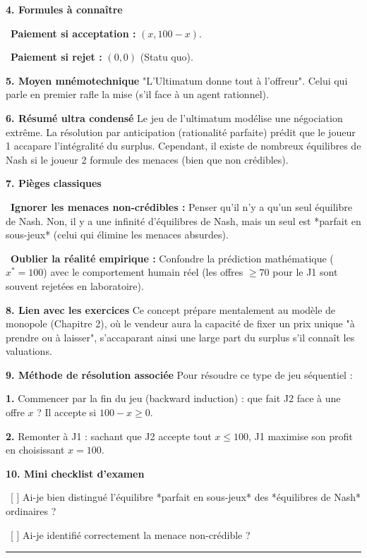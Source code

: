 \documentclass[11pt, a4paper]{report}
\begin{document}
\textbf{4. Formules à connaître}
\par \textbullet\ \textbf{Paiement si acceptation :} $(x, 100-x)$.
\par \textbullet\ \textbf{Paiement si rejet :} $(0, 0)$ (Statu quo).

\textbf{5. Moyen mnémotechnique}
"L'Ultimatum donne tout à l'offreur". Celui qui parle en premier rafle la mise (s'il face à un agent rationnel).

\textbf{6. Résumé ultra condensé}
Le jeu de l'ultimatum modélise une négociation extrême. La résolution par anticipation (rationalité parfaite) prédit que le joueur 1 accapare l'intégralité du surplus. Cependant, il existe de nombreux équilibres de Nash si le joueur 2 formule des menaces (bien que non crédibles).

\textbf{7. Pièges classiques}
\par \textbullet\ \textbf{Ignorer les menaces non-crédibles :} Penser qu'il n'y a qu'un seul équilibre de Nash. Non, il y a une infinité d'équilibres de Nash, mais un seul est *parfait en sous-jeux* (celui qui élimine les menaces absurdes).
\par \textbullet\ \textbf{Oublier la réalité empirique :} Confondre la prédiction mathématique ($x^* = 100$) avec le comportement humain réel (les offres $\ge 70$ pour le J1 sont souvent rejetées en laboratoire).

\textbf{8. Lien avec les exercices}
Ce concept prépare mentalement au modèle de monopole (Chapitre 2), où le vendeur aura la capacité de fixer un prix unique "à prendre ou à laisser", s'accaparant ainsi une large part du surplus s'il connaît les valuations.

\textbf{9. Méthode de résolution associée}
Pour résoudre ce type de jeu séquentiel :
\par \textbf{1.} Commencer par la fin du jeu (backward induction) : que fait J2 face à une offre $x$ ? Il accepte si $100-x \ge 0$.
\par \textbf{2.} Remonter à J1 : sachant que J2 accepte tout $x \le 100$, J1 maximise son profit en choisissant $x=100$.

\textbf{10. Mini checklist d'examen}
\par \textbullet\ [ ] Ai-je bien distingué l'équilibre *parfait en sous-jeux* des *équilibres de Nash* ordinaires ?
\par \textbullet\ [ ] Ai-je identifié correctement la menace non-crédible ?

\vspace{1cm}\hrule\vspace{1cm}
\end{document}
